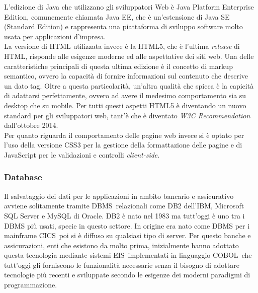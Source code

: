	L'edizione di Java che utilizzano gli sviluppatori Web è Java Platform Enterprise Edition, comunemente chiamata Java EE, che è un'estensione di Java SE (Standard Edition) e rappresenta una piattaforma di sviluppo software molto usata per applicazioni d'impresa.\\%

	La versione di HTML utilizzata invece è la HTML5, che è l'ultima \textit{release} di HTML, risponde alle esigenze moderne ed alle aspettative dei siti web. Una delle caratteristiche principali di questa ultima edizione è il concetto di markup semantico, ovvero la capacità di fornire informazioni sul contenuto che descrive un dato tag. Oltre a questa particolarità, un'altra qualità che spicca è la capicità di adattarsi perfettamente, ovvero ad avere il medesimo comportamento sia su desktop che su mobile. Per tutti questi aspetti HTML5 è diventando un nuovo standard per gli sviluppatori web, tant'è che è diventato \textit{W3C Recommendation} dall'ottobre 2014.\\

	Per quanto riguarda il comportamento delle pagine web invece si è optato per l'uso della versione CSS3 per la gestione della formattazione delle pagine e di JavaScript per le validazioni e controlli \textit{client-side}.
		
	\subsubsection{Database}
	Il salvataggio dei dati per le applicazioni in ambito bancario e assicurativo avviene solitamente tramite DBMS\glossario\ relazionali come DB2 dell'IBM, Microsoft SQL Server e MySQL di Oracle. DB2 è nato nel 1983 ma tutt'oggi è uno tra i DBMS più usati, specie in questo settore. In origine era nato come DBMS per i mainframe CICS\glossario\, poi si è diffuso su qualsiasi tipo di server. Per questo banche e assicurazioni, enti che esistono da molto prima, inizialmente hanno adottato questa tecnologia mediante sistemi EIS\glossario\ implementati in linguaggio COBOL\glossario\ che tutt'oggi gli forniscono le funzionalità necessarie senza il bisogno di adottare tecnologie più recenti e sviluppate secondo le esigenze dei moderni paradigmi di programmazione.\\
	

